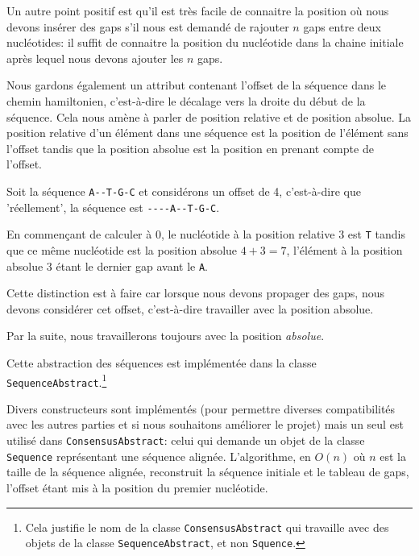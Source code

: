 Un autre point positif est qu'il est très facile de connaitre la position où nous
devons insérer des gaps s'il nous est demandé de rajouter $n$ gaps entre deux
nucléotides: il suffit de connaitre la position du nucléotide dans la chaine
initiale après lequel nous devons ajouter les $n$ gaps.

Nous gardons également un attribut contenant l'offset de la séquence dans le
chemin hamiltonien, c'est-à-dire le décalage vers la droite du début de la
séquence. Cela nous amène à parler de position relative et de position absolue.
La position relative d'un élément dans une séquence est la position de l'élément
sans l'offset tandis que la position absolue est la position en prenant compte
de l'offset.

\begin{exemple}
	Soit la séquence \verb|A--T-G-C| et considérons un offset de 4, c'est-à-dire
	que 'réellement', la séquence est \verb|----A--T-G-C|.

	En commençant de calculer à 0, le nucléotide à la position relative 3 est
	\verb|T| tandis que ce même nucléotide est la position absolue $4 + 3 = 7$,
	l'élément à la position absolue 3 étant le dernier gap avant le \verb|A|.
\end{exemple}

Cette distinction est à faire car lorsque nous devons propager des gaps, nous
devons considérer cet offset, c'est-à-dire travailler avec la position absolue.

Par la suite, nous travaillerons toujours avec la position \textit{absolue}.

Cette abstraction des séquences est implémentée dans la classe
\verb|SequenceAbstract|.\footnote{Cela justifie le nom de la classe
	\verb|ConsensusAbstract| qui travaille avec des objets de la classe
\verb|SequenceAbstract|, et non \verb|Squence|.}

Divers constructeurs sont implémentés (pour permettre diverses compatibilités
avec les autres parties et si nous souhaitons améliorer le projet) mais un seul
est utilisé dans \verb|ConsensusAbstract|: celui qui demande un objet de la
classe \verb|Sequence| représentant une séquence alignée.  L'algorithme, en
$O(n)$ où $n$ est la taille de la séquence alignée, reconstruit la séquence
initiale et le tableau de gaps, l'offset étant mis à la position du premier
nucléotide.

